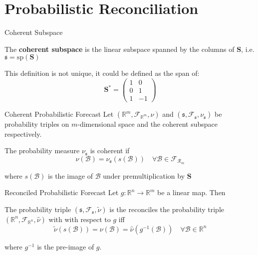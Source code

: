 \documentclass{beamer}
\begin{document}
  \section{Probabilistic Reconciliation}
  \begin{frame}{Coherent Subspace}
  	\begin{definition} 
  		The {\bf coherent subspace} is the linear subspace spanned by the columns of ${\bm S}$, i.e. $\mathfrak{s}=\mbox{sp}({\bm S})$
  	\end{definition}
    This definition is not unique, it could be defined as the span of: 
    \begin{equation*}
    {\bm S}^*=\begin{pmatrix}1&0\\0&1\\1&-1\end{pmatrix}
    \end{equation*}
  \end{frame}
  \begin{frame}{Coherent Probabilistic Forecast}
    Let $(\mathbb{R}^m,\mathcal{F}_{\mathbb{R}^m},\nu)$ and $(\mathfrak{s},\mathcal{F}_{\mathfrak{s}},\nu_\mathfrak{s})$ be probability triples on $m$-dimensional space and the coherent subspace respectively.
    \begin{definition}
      The probability measure $\nu_{\mathfrak{s}}$ is coherent if
      \begin{equation*}
      \nu(\mathcal{B})=\nu_{\mathfrak{s}}(s(\mathcal{B}))\quad\forall\mathcal{B}\in \mathcal{F}_{\mathcal{R}_m}
      \end{equation*} 
    \end{definition}
    where $s(\mathcal{B})$ is the image of $\mathcal{B}$ under premultiplication by ${\bm S}$
  \end{frame}
  \begin{frame}{Reconciled Probabilistic Forecast}
  	Let $g:\mathbb{R}^n\rightarrow\mathbb{R}^m$ be a linear map.  Then 
  	\begin{definition}
  	The probability triple $\left(\mathfrak{s},\mathcal{F}_{\mathfrak{s}},\tilde{\nu}\right)$ is the reconciles the probability triple $\left(\mathbb{R}^n,\mathcal{F}_{\mathbb{R}^n},\hat{\nu}\right)$ with with respect to $g$ iff
  	\begin{equation*}
  	\tilde{\nu}(s(\mathcal{B}))=\nu(\mathcal{B})=\hat{\nu}(g^{-1}(\mathcal{B}))\quad\forall \mathcal{B}\in\mathbb{R}^n
  	\end{equation*}
  	\end{definition}
    where $g^{-1}$ is the pre-image of $g$.
  \end{frame}
\end{document}

